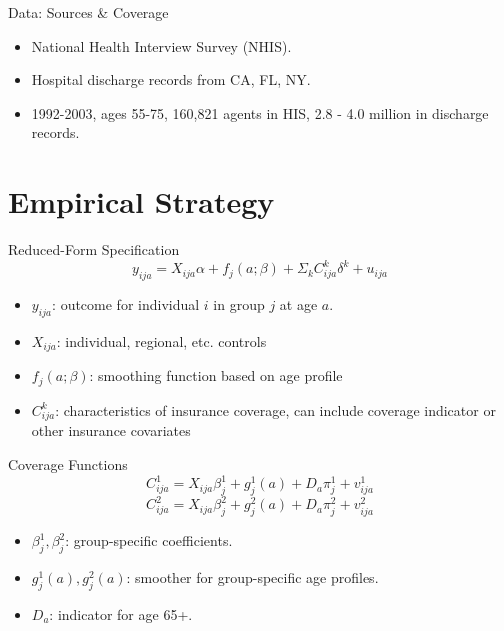 \documentclass[aspectratio=169,professionalfonts]{beamer}
\newcommand{\beq}[1]{\begin{equation}\label{#1}}
\newcommand{\eeq}{\end{equation}}
\begin{document}
\begin{frame}{Data: Sources \& Coverage}
  \begin{itemize}
    \item National Health Interview Survey (NHIS).
    \item Hospital discharge records from CA, FL, NY.
    \item 1992-2003, ages 55-75, 160,821 agents in HIS, 2.8 - 4.0 million in discharge records.
  \end{itemize}
\end{frame}


\section{Empirical Strategy}

\begin{frame}{Reduced-Form Specification}
  \beq{eq:main}
    y_{ija} = X_{ija}\alpha + f_j(a;\beta) + \Sigma_k C_{ija}^k\delta^k + u_{ija}
  \eeq
  \begin{itemize}
    \item $y_{ija}$: outcome for individual $i$ in group $j$ at age $a$.
    \item $X_{ija}$: individual, regional, etc. controls 
    \item $f_j(a;\beta)$: smoothing function based on age profile
    \item $C_{ija}^k$: characteristics of insurance coverage, can include coverage indicator or other insurance covariates
  \end{itemize}
\end{frame}

\begin{frame}{Coverage Functions}
  \beq{eq:any coverage}
    C_{ija}^1 = X_{ija}\beta_j^1 + g_j^1(a) + D_a\pi_j^1 + v_{ija}^1
  \eeq
  \beq{eq:generous coverage}
    C_{ija}^2 = X_{ija}\beta_j^2 + g_j^2(a) + D_a\pi_j^2 + v_{ija}^2
  \eeq
  \begin{itemize}
    \item $\beta_j^1, \beta_j^2$: group-specific coefficients.
    \item $g_j^1(a), g_j^2(a)$: smoother for group-specific age profiles.
    \item $D_a$: indicator for age 65+.
  \end{itemize}
\end{frame}
\end{document}
